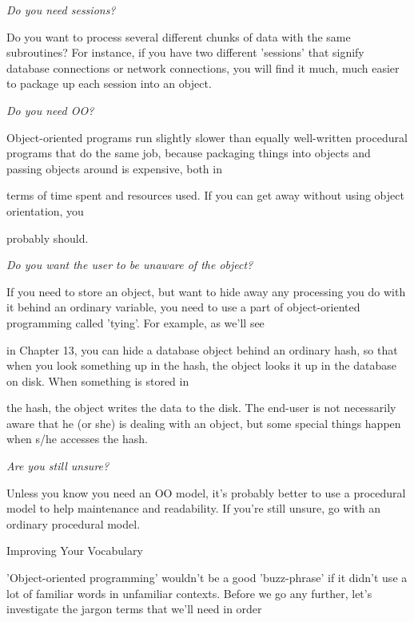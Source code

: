 \documentclass[a4paper,11pt]{book}
\begin{document}
\noindent 

\noindent \textit{Do you need sessions?}

\noindent Do you want to process several different chunks of data with the same subroutines? For instance, if you have two different 'sessions' that signify database connections or network connections, you will find it much, much easier to package up each session into an object.

\noindent 

\noindent \textit{Do you need OO?}

\noindent Object-oriented programs run slightly slower than equally well-written procedural programs that do the same job, because packaging things into objects and passing objects around is expensive, both in

\noindent terms of time spent and resources used. If you can get away without using object orientation, you

\noindent probably should.

\noindent 

\noindent 

\noindent \textit{Do you want the user to be unaware of the object?}

\noindent If you need to store an object, but want to hide away any processing you do with it behind an ordinary variable, you need to use a part of object-oriented programming called 'tying'. For example, as we'll see

\noindent in Chapter 13, you can hide a database object behind an ordinary hash, so that when you look something up in the hash, the object looks it up in the database on disk. When something is stored in

\noindent the hash, the object writes the data to the disk. The end-user is not necessarily aware that he (or she) is dealing with an object, but some special things happen when s/he accesses the hash.

\noindent 

\noindent \textit{Are you still unsure?}

\noindent Unless you know you need an OO model, it's probably better to use a procedural model to help maintenance and readability. If you're still unsure, go with an ordinary procedural model.

\noindent 

\noindent Improving Your Vocabulary

\noindent 

\noindent 'Object-oriented programming' wouldn't be a good 'buzz-phrase' if it didn't use a lot of familiar words in unfamiliar contexts. Before we go any further, let's investigate the jargon terms that we'll need in order
\end{document}

